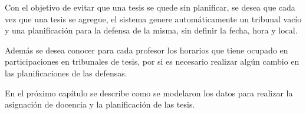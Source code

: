 Con el objetivo de evitar que una tesis se quede sin planificar, se desea que cada vez que una tesis se agregue, el sistema genere automáticamente 
un tribunal vacío y una planificación para la defensa de la misma, sin definir la fecha, hora y local.

Además se desea conocer para cada profesor los horarios que tiene ocupado en participaciones en tribunales
de tesis, por si es necesario realizar algún cambio en las planificaciones de las defensas.




En el próximo capítulo se describe como se modelaron los datos para realizar la asignación de 
docencia y la planificación de las tesis.


